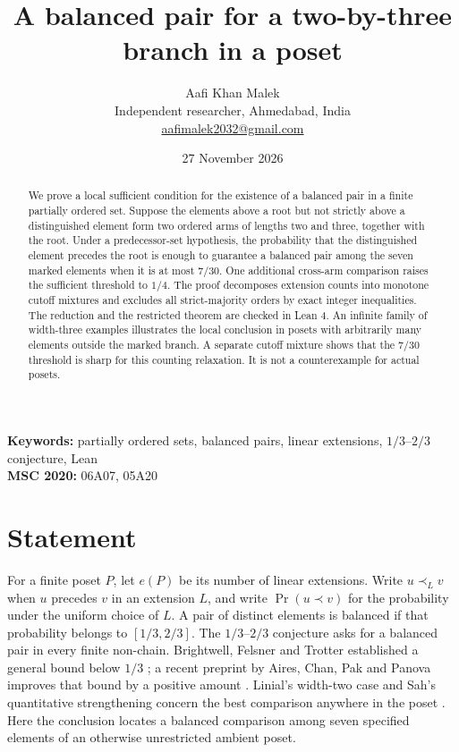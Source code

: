 \documentclass[11pt]{article}
\title{A balanced pair for a two-by-three branch in a poset}
\author{Aafi Khan Malek\\[-2pt]
\small Independent researcher, Ahmedabad, India\\[-2pt]
\small \href{mailto:aafimalek2032@gmail.com}{aafimalek2032@gmail.com}}
\date{27 November 2026}
\newcommand{\PrE}{\Pr}
\begin{document}
\maketitle

\begin{abstract}
We prove a local sufficient condition for the existence of a balanced pair
in a finite partially ordered set. Suppose the elements above a root but
not strictly above a distinguished element form two ordered arms of lengths
two and three, together with the root. Under a predecessor-set hypothesis,
the probability that the distinguished element precedes the root is enough
to guarantee a balanced pair among the seven marked elements when it is at
most $7/30$. One additional cross-arm comparison raises the sufficient
threshold to $1/4$. The proof decomposes extension counts into monotone
cutoff mixtures and excludes all strict-majority orders by exact integer
inequalities. The reduction and the restricted theorem are checked in
Lean 4. An infinite family of width-three examples illustrates the local
conclusion in posets with arbitrarily many elements outside the marked
branch. A separate cutoff mixture shows that the $7/30$ threshold is sharp
for this counting relaxation. It is not a counterexample for actual posets.
\end{abstract}

\noindent\textbf{Keywords:} partially ordered sets, balanced pairs, linear
extensions, $1/3$--$2/3$ conjecture, Lean \\
\textbf{MSC 2020:} 06A07, 05A20

\section{Statement}
For a finite poset $P$, let $e(P)$ be its number of linear extensions.
Write $u\prec_L v$ when $u$ precedes $v$ in an extension $L$, and write
$\PrE(u\prec v)$ for the probability under the uniform choice of $L$.
A pair of distinct elements is balanced if that probability belongs to
$[1/3,2/3]$. The $1/3$--$2/3$ conjecture asks for a balanced pair in every
finite non-chain. Brightwell, Felsner and Trotter established a general
bound below $1/3$ \cite{bft}; a recent preprint by Aires, Chan, Pak and
Panova improves that bound by a positive amount \cite{acpp}.
Linial's width-two case and Sah's quantitative strengthening concern
the best comparison anywhere in the poset \cite{linial,sah}.
Here the conclusion locates a balanced comparison among seven specified
elements of an otherwise unrestricted ambient poset.
\end{document}
